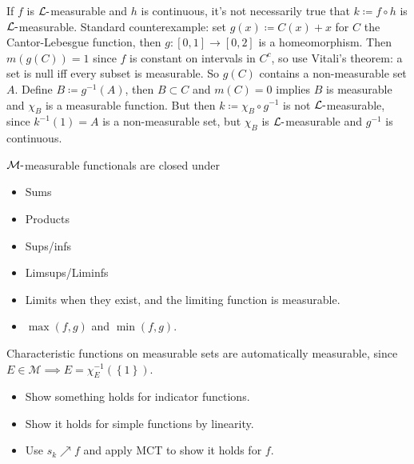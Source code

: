 \begin{warnings}

If \(f\) is \({\mathcal{L}}{\hbox{-}}\)measurable and \(h\) is
continuous, it's not necessarily true that \(k\coloneqq f\circ h\) is
\({\mathcal{L}}{\hbox{-}}\)measurable. Standard counterexample: set
\(g(x) \coloneqq C(x) + x\) for \(C\) the Cantor-Lebesgue function, then
\(g:[0, 1]\to [0, 2]\) is a homeomorphism. Then \(m(g(C)) = 1\) since
\(f\) is constant on intervals in \(C^c\), so use Vitali's theorem: a
set is null iff every subset is measurable. So \(g(C)\) contains a
non-measurable set \(A\). Define \(B\coloneqq g^{-1}(A)\), then
\(B \subset C\) and \(m(C) = 0\) implies \(B\) is measurable and
\(\chi_B\) is a measurable function. But then
\(k\coloneqq\chi_B \circ g^{-1}\) is not
\({\mathcal{L}}{\hbox{-}}\)measurable, since \(k^{-1}(1) = A\) is a
non-measurable set, but \(\chi_B\) is
\({\mathcal{L}}{\hbox{-}}\)measurable and \(g^{-1}\) is continuous.

\end{warnings}

\begin{proposition}

\({\mathcal{M}}{\hbox{-}}\)measurable functionals are closed under

\begin{itemize}
\tightlist
\item
  Sums
\item
  Products
\item
  Sups/infs
\item
  Limsups/Liminfs
\item
  Limits when they exist, and the limiting function is measurable.
\item
  \(\max(f, g)\) and \(\min(f, g)\).
\end{itemize}

Characteristic functions on measurable sets are automatically
measurable, since
\(E\in {\mathcal{M}}\implies E = \chi_E^{-1}(\left\{{1}\right\})\).

\end{proposition}

\begin{remark}

\envlist

\begin{itemize}
\tightlist
\item
  Show something holds for indicator functions.
\item
  Show it holds for simple functions by linearity.
\item
  Use \(s_k \nearrow f\) and apply MCT to show it holds for \(f\).
\end{itemize}

\end{remark}

